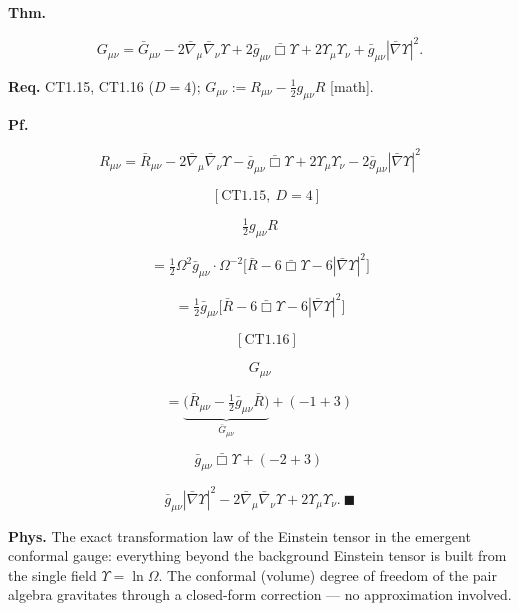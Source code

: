 \begin{theorem}[{\texorpdfstring{CT1.17 — Einstein tensor under conformal rescaling in $D=4$}{CT1.17 - Einstein tensor under conformal rescaling in}}]\label{tag:CT1-17}
\textbf{Thm.}

\[
G_{\mu\nu}=\bar G_{\mu\nu}-2\bar\nabla_\mu\bar\nabla_\nu\Upsilon+2\bar g_{\mu\nu}\bar\Box\Upsilon+2\Upsilon_\mu\Upsilon_\nu+\bar g_{\mu\nu}|\bar\nabla\Upsilon|^2 .
\]

\textbf{Req.} CT1.15, CT1.16 ($D=4$); $G_{\mu\nu}:=R_{\mu\nu}-\tfrac12g_{\mu\nu}R$ [math].

\textbf{Pf.}

\[
R_{\mu\nu}=\bar R_{\mu\nu}-2\bar\nabla_\mu\bar\nabla_\nu\Upsilon-\bar g_{\mu\nu}\bar\Box\Upsilon+2\Upsilon_\mu\Upsilon_\nu-2\bar g_{\mu\nu}|\bar\nabla\Upsilon|^2
\]

\[
\quad [\mathrm{CT1.15},\ D=4]
\]

\[
\tfrac12g_{\mu\nu}R
\]

\[
= \tfrac12\Omega^2\bar g_{\mu\nu}\cdot\Omega^{-2}\bigl[\bar R-6\bar\Box\Upsilon-6|\bar\nabla\Upsilon|^2\bigr]
\]

\[
= \tfrac12\bar g_{\mu\nu}\bigl[\bar R-6\bar\Box\Upsilon-6|\bar\nabla\Upsilon|^2\bigr]
\]

\[
\quad [\mathrm{CT1.16}]
\]

\[
G_{\mu\nu}
\]

\[
= \underbrace{\bigl(\bar R_{\mu\nu}-\tfrac12\bar g_{\mu\nu}\bar R\bigr)}_{\bar G_{\mu\nu}}+(-1+3)\,
\]

\[
\bar g_{\mu\nu}\bar\Box\Upsilon+(-2+3)\,
\]

\[
\bar g_{\mu\nu}|\bar\nabla\Upsilon|^2-2\bar\nabla_\mu\bar\nabla_\nu\Upsilon+2\Upsilon_\mu\Upsilon_\nu.\ \blacksquare
\]

\textbf{Phys.} The exact transformation law of the Einstein tensor in the emergent conformal gauge: everything beyond the background Einstein tensor is built from the single field $\Upsilon=\ln\Omega$. The conformal (volume) degree of freedom of the pair algebra gravitates through a closed-form correction — no approximation involved.

\end{theorem}

